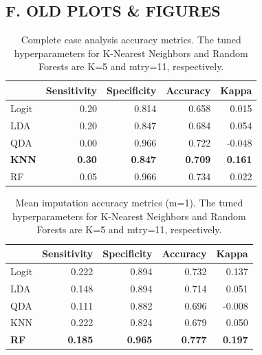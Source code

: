 \documentclass[12pt,]{article}
\begin{document}
\subsection*{F. OLD PLOTS \& FIGURES}\label{f.-old-plots-figures}

\begin{table}[!h]

\caption{\label{tab:unnamed-chunk-21}\label{tab:cc-metrics} Complete case analysis accuracy metrics.  The tuned hyperparameters for K-Nearest Neighbors and Random Forests are K=5 and mtry=11, respectively.}
\centering
\fontsize{10}{12}\selectfont
\begin{tabular}{lrrrr}
\toprule
  & Sensitivity & Specificity & Accuracy & Kappa\\
\midrule
Logit & 0.20 & 0.814 & 0.658 & 0.015\\
LDA & 0.20 & 0.847 & 0.684 & 0.054\\
QDA & 0.00 & 0.966 & 0.722 & -0.048\\
\textbf{KNN} & \textbf{0.30} & \textbf{0.847} & \textbf{0.709} & \textbf{0.161}\\
RF & 0.05 & 0.966 & 0.734 & 0.022\\
\bottomrule
\end{tabular}
\end{table}

\begin{table}[!h]

\caption{\label{tab:unnamed-chunk-22}\label{tab:mean-metrics} Mean imputation accuracy metrics (m=1).  The tuned hyperparameters for K-Nearest Neighbors and Random Forests are K=5 and mtry=11, respectively.}
\centering
\fontsize{10}{12}\selectfont
\begin{tabular}{lrrrr}
\toprule
  & Sensitivity & Specificity & Accuracy & Kappa\\
\midrule
Logit & 0.222 & 0.894 & 0.732 & 0.137\\
LDA & 0.148 & 0.894 & 0.714 & 0.051\\
QDA & 0.111 & 0.882 & 0.696 & -0.008\\
KNN & 0.222 & 0.824 & 0.679 & 0.050\\
\textbf{RF} & \textbf{0.185} & \textbf{0.965} & \textbf{0.777} & \textbf{0.197}\\
\bottomrule
\end{tabular}
\end{table}
\end{document}
